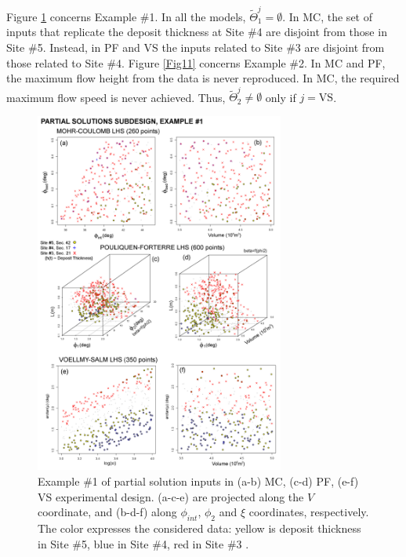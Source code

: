 \documentclass[nhess, manuscript]{copernicus}
\begin{document}
Figure \ref{Fig11_0} concerns Example \#1. In all the models, $\tilde\Theta_1^j=\emptyset$. In MC, the set of inputs that replicate the deposit thickness at Site \#4 are disjoint from those in Site \#5. Instead, in PF and VS the inputs related to Site \#3 are disjoint from those related to Site \#4. Figure \ref{Fig11} concerns Example \#2. In MC and PF, the  maximum flow height from the data is never reproduced. In MC, the required maximum flow speed is never achieved. Thus, $\tilde\Theta_2^j\neq\emptyset$ only if $j=\textrm{VS}$.

\begin{figure}[H]
\centering
\includegraphics[width=0.73\textwidth]{Fig11_0.png}
\caption{Example \#1 of partial solution inputs in (a-b) MC, (c-d) PF, (e-f) VS experimental design. (a-c-e) are projected along the $V$ coordinate, and (b-d-f) along $\phi_{int}$, $\phi_2$ and $\xi$ coordinates, respectively. The color expresses the considered data: yellow is deposit thickness in Site \#5, blue in Site \#4, red in Site \#3 \citep{Saucedo2008}.}
\label{Fig11_0}
\end{figure}
\end{document}
